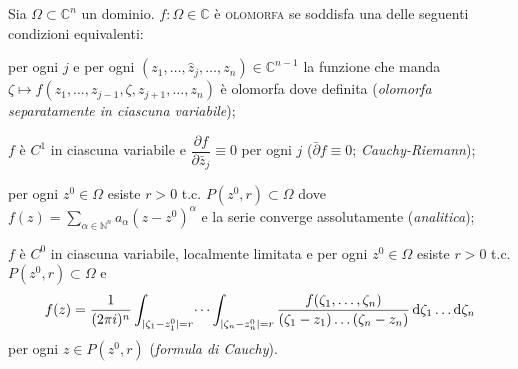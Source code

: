 \begin{defn}
  Sia $\Omega \subset \mathbb{C}^n$ un dominio. $f: \Omega \in \mathbb{C}$ è \textsc{olomorfa} se soddisfa una delle seguenti condizioni equivalenti:
  \begin{nlist}
    \item per ogni $j$ e per ogni $(z_1, \dots, \hat{z}_j,\dots, z_n) \in \mathbb{C}^{n-1}$ la funzione che manda $\zeta \longmapsto f(z_1, \dots, z_{j-1}, \zeta, z_{j+1}, \dots, z_n)$ è olomorfa dove definita (\textit{olomorfa separatamente in ciascuna variabile});
    \item $f$ è $C^1$ in ciascuna variabile e $\dfrac{\partial f}{\partial \bar{z}_j} \equiv 0$ per ogni $j$ ($\bar{\partial} f\equiv 0$; \textit{Cauchy-Riemann});
    \item per ogni $z^0 \in \Omega$ esiste $r>0$ t.c. $P(z^0, r) \subset \Omega$ dove $\displaystyle f(z)=\sum_{\alpha \in \mathbb{N}^n} a_{\alpha}(z-z^0)^{\alpha}$ e la serie converge assolutamente (\textit{analitica});
    \item $f$ è $C^0$ in ciascuna variabile, localmente limitata e per ogni $z^0 \in \Omega$ esiste $r>0$ t.c. $P(z^0, r) \subset \Omega$ e
    $$f(z)=\dfrac{1}{(2\pi i)^n} \int_{|\zeta_1-z_1^0|=r}\dots\int_{|\zeta_n-z_n^0|=r} \frac{f(\zeta_1,\dots,\zeta_n)}{(\zeta_1-z_1)\dots(\zeta_n-z_n)}\mathop{}\!\mathrm{d}\zeta_1\dots\mathop{}\!\mathrm{d}\zeta_n$$ per ogni $z \in P(z^0, r)$ (\textit{formula di Cauchy}).
  \end{nlist}
\end{defn}
